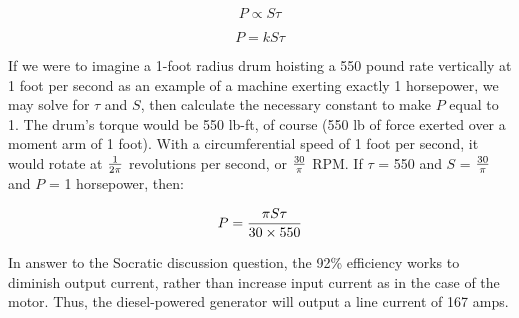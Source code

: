 $$P \propto S \tau $$

$$P = k S \tau $$

If we were to imagine a 1-foot radius drum hoisting a 550 pound rate vertically at 1 foot per second as an example of a machine exerting exactly 1 horsepower, we may solve for $\tau$ and $S$, then calculate the necessary constant to make $P$ equal to 1.  The drum's torque would be 550 lb-ft, of course (550 lb of force exerted over a moment arm of 1 foot).  With a circumferential speed of 1 foot per second, it would rotate at $1 \over {2 \pi}$ revolutions per second, or $30 \over \pi$ RPM.  If $\tau$ = 550 and $S$ = $30 \over \pi$ and $P$ = 1 horsepower, then:

$$P = {\pi S \tau \over {30 \times 550}}$$

\vskip 10pt

In answer to the Socratic discussion question, the 92\% efficiency works to diminish output current, rather than increase input current as in the case of the motor.  Thus, the diesel-powered generator will output a line current of 167 amps.











